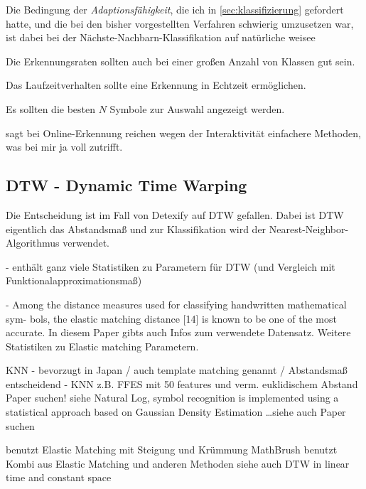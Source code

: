 Die Bedingung der \emph{Adaptionsfähigkeit}, die ich in \ref{sec:klassifizierung} gefordert hatte, und die bei den bisher vorgestellten Verfahren schwierig umzusetzen war, ist dabei bei der Nächste-Nachbarn-Klassifikation auf natürliche weisee

\item[Skalierbarkeit] Die Erkennungsraten sollten auch bei einer großen Anzahl von Klassen gut sein. 
\item[Laufzeitverhalten] Das Laufzeitverhalten sollte eine Erkennung in Echtzeit ermöglichen. 
\item[Interaktivität] Es sollten die besten $N$ Symbole zur Auswahl angezeigt werden. 


\citet{Tappert:1990p10302} sagt bei Online-Erkennung reichen wegen der Interaktivität einfachere Methoden, was bei mir ja voll zutrifft.

\subsection[DTW]{DTW - Dynamic Time Warping} \label{sub:dtw}

Die Entscheidung ist im Fall von Detexify auf \ac{DTW} gefallen. Dabei ist \ac{DTW} eigentlich das Abstandsmaß und zur Klassifikation wird der Nearest-Neighbor-Algorithmus verwendet.

- \cite{Golubitsky:2009p1842} enthält ganz viele Statistiken zu Parametern für DTW (und Vergleich mit Funktionalapproximationsmaß)

- \cite{Golubitsky:2009p2433} Among the distance measures used for classifying handwritten mathematical sym- bols, the elastic matching distance [14] is known to be one of the most accurate. In diesem Paper gibts auch Infos zum verwendete Datensatz. Weitere Statistiken zu Elastic matching Parametern.

KNN - bevorzugt in Japan \cite{Jaeger:2003p1097} / auch template matching genannt / Abstandsmaß entscheidend - KNN z.B. FFES mit 50 features und verm. euklidischem Abstand \TODO Paper suchen! siehe \cite{Vuong:2010p10279} Natural Log, symbol recognition is implemented using a statistical approach based on Gaussian Density Estimation \dots siehe auch \cite{Vuong:2010p10279} \TODO Paper suchen



\cite{Vuong:2010p10279} benutzt Elastic Matching mit Steigung und Krümmung MathBrush \cite{Labahn:2008p10301} benutzt Kombi aus Elastic Matching und anderen Methoden siehe auch \cite{MacLean:2010p9970} DTW in linear time and constant space


